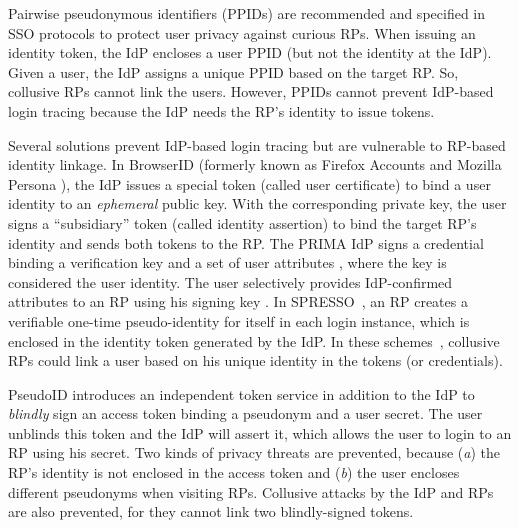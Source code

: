 Pairwise pseudonymous identifiers (PPIDs) are recommended \cite{NIST2017draft}
 and specified in SSO protocols \cite{OpenIDConnect, SAMLIdentifier} to protect user privacy against curious RPs.
When issuing an identity token,
        the IdP encloses a user PPID (but not the identity at the IdP).
Given a user, the IdP assigns a unique PPID based on the target RP.
So, collusive RPs cannot link the users.
However, PPIDs cannot prevent IdP-based login tracing because the IdP needs the RP's identity to issue tokens.



Several solutions prevent IdP-based login tracing but are vulnerable to RP-based identity linkage.
In BrowserID \cite{BrowserID} (formerly known as Firefox Accounts \cite{FirefoxAccount} and Mozilla Persona \cite{persona}), the IdP %
issues a special token (called user certificate) to bind a user identity to an \emph{ephemeral} public key. With the corresponding private key, the user signs a ``subsidiary'' token (called identity assertion) to bind the target RP's identity and sends both tokens to the RP.
The PRIMA IdP signs a credential binding a verification key and a set of user attributes \cite{prima}, where the key is considered the user identity.
The user selectively provides IdP-confirmed attributes to an RP using his signing key \cite{Oblivion}. %
In SPRESSO~\cite{SPRESSO}, an RP creates a verifiable one-time pseudo-identity for itself in each login instance, which is enclosed in the identity token generated by the IdP. %
In these schemes~\cite{BrowserID,prima,SPRESSO}, collusive RPs could link a user based on his unique identity in the tokens (or credentials).


PseudoID \cite{PseudoID} introduces an independent token service in addition to the IdP to \emph{blindly} sign an access token binding a pseudonym and a user secret.
The user unblinds this token and the IdP will assert it,
    which allows the user to login to an RP using his secret.
Two kinds of privacy threats are prevented, because (\emph{a}) the RP's identity is not enclosed in the access token
    and (\emph{b}) the user encloses different pseudonyms when visiting RPs.
Collusive attacks by the IdP and RPs are also prevented,
    for they cannot link two blindly-signed tokens.




